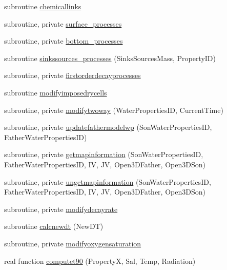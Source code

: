 \begin{DoxyCompactItemize}
\item 
subroutine \mbox{\hyperlink{namespacemodulewaterproperties_af5a9b4a5acf0da8a86fcabea8bf09f28}{chemicallinks}}
\item 
subroutine, private \mbox{\hyperlink{namespacemodulewaterproperties_a3741d54f8b36c751fb10748ab34af465}{surface\+\_\+processes}}
\item 
subroutine, private \mbox{\hyperlink{namespacemodulewaterproperties_aaba72b54a08a1561f8eff8fae60998f2}{bottom\+\_\+processes}}
\item 
subroutine \mbox{\hyperlink{namespacemodulewaterproperties_a10d63582cfbe1d7e4a4c18ad2b27ffc5}{sinkssources\+\_\+processes}} (Sinks\+Sources\+Mass, Property\+ID)
\item 
subroutine, private \mbox{\hyperlink{namespacemodulewaterproperties_a8e4fffcfd269b64a4795cf007ee2b707}{firstorderdecayprocesses}}
\item 
subroutine \mbox{\hyperlink{namespacemodulewaterproperties_aaeed6e345543d58d8feee181656796d0}{modifyimposedrycells}}
\item 
subroutine, private \mbox{\hyperlink{namespacemodulewaterproperties_aa39cc64df05076f8396e1894e6e74ad5}{modifytwoway}} (Water\+Properties\+ID, Current\+Time)
\item 
subroutine, private \mbox{\hyperlink{namespacemodulewaterproperties_ad407a42c26969949261233d9d0aa8da1}{updatefathermodelwp}} (Son\+Water\+Properties\+ID, Father\+Water\+Properties\+ID)
\item 
subroutine, private \mbox{\hyperlink{namespacemodulewaterproperties_a1b70dbb2ea91a797c991fcc031837095}{getmapinformation}} (Son\+Water\+Properties\+ID, Father\+Water\+Properties\+ID, IV, JV, Open3\+D\+Father, Open3\+D\+Son)
\item 
subroutine, private \mbox{\hyperlink{namespacemodulewaterproperties_ab369effb692dc27866518b2a5fa9fe1b}{ungetmapinformation}} (Son\+Water\+Properties\+ID, Father\+Water\+Properties\+ID, IV, JV, Open3\+D\+Father, Open3\+D\+Son)
\item 
subroutine, private \mbox{\hyperlink{namespacemodulewaterproperties_a5d19c5c0edd1b4706080cd0259456cd8}{modifydecayrate}}
\item 
subroutine \mbox{\hyperlink{namespacemodulewaterproperties_a370617430ffb5b34448cfc27deca6c88}{calcnewdt}} (New\+DT)
\item 
subroutine, private \mbox{\hyperlink{namespacemodulewaterproperties_a44ca5a1d937416e29607a7effa0209d5}{modifyoxygensaturation}}
\item 
real function \mbox{\hyperlink{namespacemodulewaterproperties_a5dbf64b0ab9b6e7fc74c9425dd2e5801}{computet90}} (PropertyX, Sal, Temp, Radiation)

\end{DoxyCompactItemize}
